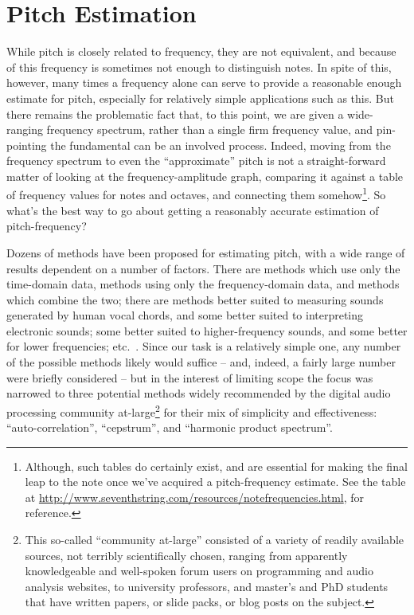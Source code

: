 \documentclass[12pt]{report}
\begin{document}
\section{Pitch Estimation}
\indent While pitch is closely related to frequency, they are not equivalent, and because of this frequency is sometimes not enough to distinguish notes. In spite of this, however, many times a frequency alone can serve to provide a reasonable enough estimate for pitch, especially for relatively simple applications such as this. But there remains the problematic fact that, to this point, we are given a wide-ranging frequency spectrum, rather than a single firm frequency value, and pin-pointing the fundamental can be an involved process. Indeed, moving from the frequency spectrum to even the ``approximate'' pitch is not a straight-forward matter of looking at the frequency-amplitude graph, comparing it against a table of frequency values for notes and octaves, and connecting them somehow\footnote{Although, such tables do certainly exist, and are essential for making the final leap to the note once we've acquired a pitch-frequency estimate. See the table at \url{http://www.seventhstring.com/resources/notefrequencies.html}, for reference.}. So what's the best way to go about getting a reasonably accurate estimation of pitch-frequency?

\indent Dozens of methods have been proposed for estimating pitch, with a wide range of results dependent on a number of factors. There are methods which use only the time-domain data, methods using only the frequency-domain data, and methods which combine the two; there are methods better suited to measuring sounds generated by human vocal chords, and some better suited to interpreting electronic sounds; some better suited to higher-frequency sounds, and some better for lower frequencies; etc.~\cite{delaCuadra-nd,Nicholson2011}. Since our task is a relatively simple one, any number of the possible methods likely would suffice -- and, indeed, a fairly large number were briefly considered -- but in the interest of limiting scope the focus was narrowed to three potential methods widely recommended by the digital audio processing community at-large\footnote{This so-called ``community at-large'' consisted of a variety of readily available sources, not terribly scientifically chosen, ranging from apparently knowledgeable and well-spoken forum users on programming and audio analysis websites, to university professors, and master's and PhD students that have written papers, or slide packs, or blog posts on the subject.} for their mix of simplicity and effectiveness: ``auto-correlation'', ``cepstrum'', and ``harmonic product spectrum''.
\end{document}
